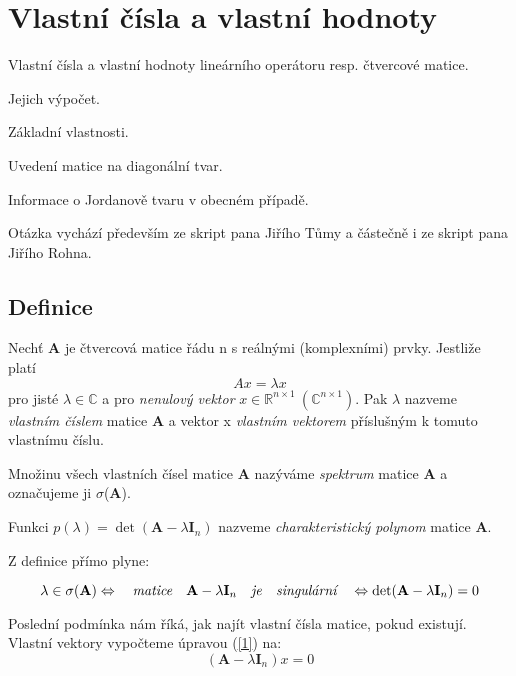 \section{Vlastní čísla a vlastní hodnoty}


\begin{pozadavky}
\begin{pitemize}
\item Vlastní čísla a vlastní hodnoty lineárního operátoru resp. čtvercové matice.
\item Jejich výpočet.
\item Základní vlastnosti.
\item Uvedení matice na diagonální tvar.
\item Informace o Jordanově tvaru v obecném případě.
\end{pitemize}
\end{pozadavky}

Otázka vychází především ze skript pana Jiřího Tůmy a částečně i ze skript pana Jiřího Rohna.

\subsection{Definice}
\begin{definice}
Nechť \textbf{A} je čtvercová matice řádu n s reálnými (komplexními) prvky. Jestliže platí
\begin{equation}\label{1}Ax = \lambda x\end{equation}
pro jisté $\lambda \in \mathbb{C}$ a pro \emph{nenulový vektor} $x \in \mathbb{R}^{n\times1}\ (\mathbb{C}^{n\times1}) $. Pak $\lambda$ nazveme \emph{vlastním číslem} matice
\textbf{A} a vektor x \emph{vlastním vektorem} příslušným k tomuto vlastnímu číslu.

Množinu všech vlastních čísel matice \textbf{A} nazýváme \emph{spektrum} matice \textbf{A} a označujeme ji $\sigma$(\textbf{A}).

Funkci $p(\lambda) = \det(\textbf{A} - \lambda \textbf{I}_n)$ nazveme \emph{charakteristický polynom} matice \textbf{A}.
\end{definice}

\begin{pozorovani}
Z definice přímo plyne:

$$\lambda \in \sigma(\textbf{A}) \Leftrightarrow \quad\textit{matice}\quad \textbf{A} - \lambda \textbf{I}_n \quad\textit{je\quad singulární}\quad \Leftrightarrow \det( \textbf{A} - \lambda \textbf{I}_n ) = 0$$

Poslední podmínka nám říká, jak najít vlastní čísla matice, pokud existují.
Vlastní vektory vypočteme úpravou (\ref{1}) na: \begin{displaymath}(\textbf{A}-\lambda \textbf{I}_n)x=0\end{displaymath}
\end{pozorovani}

